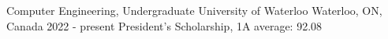 

\begin{cventries}

  \cventry
    {Computer Engineering, Undergraduate} %
    {University of Waterloo} %
    {Waterloo, ON, Canada} %
    {2022 - present} %
    {President's Scholarship, 1A average: 92.08}

\end{cventries}
